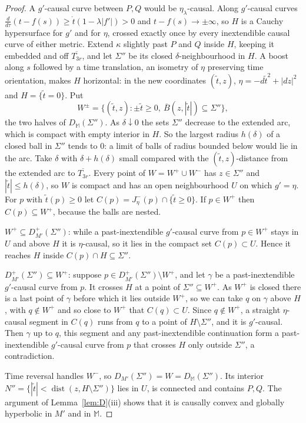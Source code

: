 \documentclass[11pt]{article}
\theoremstyle{definition}
\newcommand{\Mink}{\mathbb M}
\newcommand{\Jm}{J^{-}}
\begin{document}
\begin{proof}
A $g'$-causal curve between $P,Q$ would be $\eta_\lambda$-causal. Along
$g'$-causal curves $\tfrac{d}{d\tau}(t-f(s))\ge\dot t(1-\lambda|f'|)>0$ and
$t-f(s)\to\pm\infty$, so $H$ is a Cauchy hypersurface for $g'$ and for $\eta$,
crossed exactly once by every inextendible causal curve of either metric.
Extend $\kappa$ slightly past $P$ and $Q$ inside $H$, keeping it embedded and off $\overline{T_{3r}}$, and let $\Sigma''$ be its closed
$\delta$-neighbourhood in $H$. A boost along $s$ followed by a time translation, an isometry of $\eta$ preserving time orientation, makes $H$ horizontal: in the new coordinates $(\tilde t,z)$, $\eta=-d\tilde t^2+|dz|^2$ and
$H=\{\tilde t=0\}$. Put
\[
W^\pm=\{(\tilde t,z):\pm\tilde t\ge0,\ \overline B(z,|\tilde t|)\subseteq\Sigma''\},
\]
the two halves of $D_\Mink(\Sigma'')$. As $\delta\downarrow0$ the sets $\Sigma''$ decrease to the extended arc, which is compact with empty interior in $H$. So the largest radius $h(\delta)$ of a closed ball in $\Sigma''$ tends to $0$: a limit of balls of radius bounded below would lie in the arc. Take $\delta$ with $\delta+h(\delta)$ small compared with the $(\tilde t,z)$-distance from the extended arc to $\overline{T_{3r}}$. Every point of $W=W^+\cup W^-$ has $z\in\Sigma''$ and $|\tilde t|\le h(\delta)$, so $W$ is compact and has an open neighbourhood $U$ on which $g'=\eta$.
For $p$ with $\tilde t(p)\ge0$ let $C(p)=\Jm_\eta(p)\cap\{\tilde t\ge0\}$. If $p\in
W^+$ then $C(p)\subseteq W^+$, because the balls are nested.

$W^+\subseteq D^+_{M'}(\Sigma'')$: while a past-inextendible $g'$-causal curve from
$p\in W^+$ stays in $U$ and above $H$ it is $\eta$-causal, so it lies in the
compact set $C(p)\subset U$. Hence it reaches $H$ inside $C(p)\cap H\subseteq\Sigma''$.

$D^+_{M'}(\Sigma'')\subseteq W^+$: suppose $p\in D^+_{M'}(\Sigma'')\setminus W^+$, and let
$\gamma$ be a past-inextendible $g'$-causal curve from $p$. It crosses $H$ at a
point of $\Sigma''\subseteq W^+$. As $W^+$ is closed there is a last point of $\gamma$
before which it lies outside $W^+$, so we can take $q$ on $\gamma$ above $H$, with
$q\notin W^+$ and so close to $W^+$ that $C(q)\subset U$. Since $q\notin W^+$, a
straight $\eta$-causal segment in $C(q)$ runs from $q$ to a point of
$H\setminus\Sigma''$, and it is $g'$-causal. Then $\gamma$ up to $q$, this segment
and any past-inextendible continuation form a past-inextendible $g'$-causal curve
from $p$ that crosses $H$ only outside $\Sigma''$, a contradiction.

Time reversal handles $W^-$, so $D_{M'}(\Sigma'')=W=D_\Mink(\Sigma'')$. Its interior
$N''=\{|\tilde t|<\operatorname{dist}(z,H\setminus\Sigma'')\}$ lies in $U$, is connected
and contains $P,Q$. The argument of Lemma~\ref{lem:D}(iii) shows that it is causally
convex and globally hyperbolic in $M'$ and in $\Mink$.
\end{proof}
\end{document}
